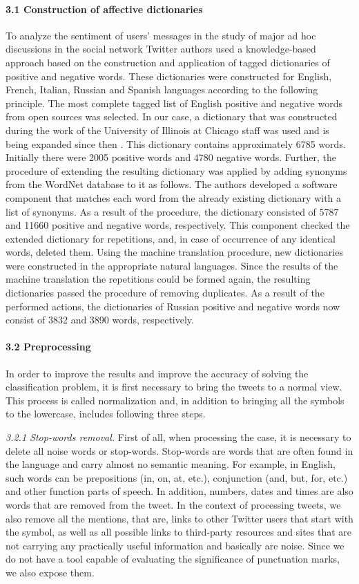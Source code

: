 \paragraph{3.1 Construction of affective dictionaries} 
To analyze the sentiment of users’ messages in the study of major ad hoc discussions in the social network Twitter authors used a knowledge-based approach based on the construction and application of tagged dictionaries of positive and negative words. These dictionaries were constructed for English, French, Italian, Russian and Spanish languages according to the following principle. The most complete tagged list of English positive and negative words from open sources was selected. In our case, a dictionary that was constructed during the work of the University of Illinois at Chicago staff was used and is being expanded since then \cite{EnglishOpinionWords}. This dictionary contains approximately 6785 words. Initially there were 2005 positive words and 4780 negative words. Further, the procedure of extending the resulting dictionary was applied by adding synonyms from the WordNet database to it as follows. The authors developed a software component that matches each word from the already existing dictionary with a list of synonyms. As a result of the procedure, the dictionary consisted of 5787 and 11660 positive and negative words, respectively. This component checked the extended dictionary for repetitions, and, in case of occurrence of any identical words, deleted them. Using the machine translation procedure, new dictionaries were constructed in the appropriate natural languages. Since the results of the machine translation the repetitions could be formed again, the resulting dictionaries passed the procedure of removing duplicates. As a result of the performed actions, the dictionaries of Russian positive and negative words now consist of 3832 and 3890 words, respectively.

\paragraph{3.2 Preprocessing}
In order to improve the results and improve the accuracy of solving the classification problem, it is first necessary to bring the tweets to a normal view. This process is called normalization and, in addition to bringing all the symbols to the lowercase, includes following three steps.

\textit{3.2.1 Stop-words removal.} First of all, when processing the case, it is necessary to delete all noise words or stop-words. Stop-words are words that are often found in the language and carry almost no semantic meaning. For example, in English, such words can be prepositions (in, on, at, etc.), conjunction (and, but, for, etc.) and other function parts of speech. In addition, numbers, dates and times are also words that are removed from the tweet. In the context of processing tweets, we also remove all the mentions, that are, links to other Twitter users that start with the \@ symbol, as well as all possible links to third-party resources and sites that are not carrying any practically useful information and basically are noise. Since we do not have a tool capable of evaluating the significance of punctuation marks, we also expose them.

